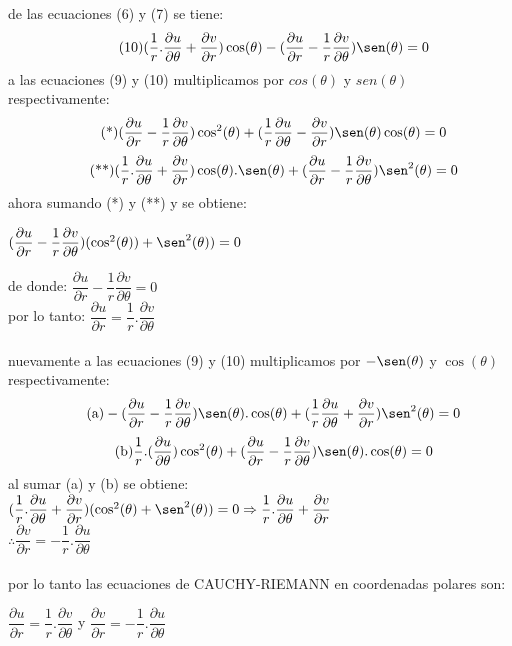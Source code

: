 \documentclass[10pt,a4paper]{book}
\begin{document}
 de las ecuaciones (6) y (7) se tiene: 
 \begin{equation}
  \tag{10}
  (\dfrac{1}{r} . \dfrac{\partial u}{\partial \theta} + \dfrac{\partial v}{\partial r}) \cos(\theta) - (\dfrac{\partial u}{\partial r} - \dfrac{1}{r} \dfrac{\partial v}{\partial \theta}) \sen(\theta) = 0 
 \end{equation}
 a las ecuaciones (9) y (10) multiplicamos por $cos(\theta)$ y $sen(\theta)$ respectivamente:
 \begin{equation}
  \tag{*}
  (\dfrac{\partial u}{\partial r} - \dfrac{1}{r} \dfrac{\partial v}{\partial \theta}) \cos^2(\theta) + (\dfrac{1}{r}\dfrac{\partial u}{\partial \theta} -  \dfrac{\partial v}{\partial r}) \sen(\theta) \cos(\theta) = 0 
 \end{equation}
 \begin{equation}
  \tag{**}
  (\dfrac{1}{r} . \dfrac{\partial u}{\partial \theta} + \dfrac{\partial v}{\partial r}) \cos(\theta). \sen(\theta) + (\dfrac{\partial u}{\partial r} - \dfrac{1}{r} \dfrac{\partial v}{\partial \theta}) \sen^2(\theta) = 0 
 \end{equation}
 ahora sumando (*) y (**) y se obtiene:
 \begin{center}
 $ (\dfrac{\partial u}{\partial r} - \dfrac{1}{r} \dfrac{\partial v}{\partial \theta})(\cos^2(\theta)) + \sen^2(\theta)) = 0 $
 \end{center}
de donde: $\dfrac{\partial u}{\partial r} - \dfrac{1}{r} \dfrac{\partial v}{\partial \theta} = 0$ \\
por lo tanto: \textbf{$\dfrac{\partial u}{\partial r} = \dfrac{1}{r}.\dfrac{\partial v}{\partial \theta}$} \\ \\
nuevamente a las ecuaciones (9) y (10) multiplicamos por $-\sen(\theta)$ y $\cos(\theta)$ respectivamente: 
\begin{equation}
 \tag{a}
 -(\dfrac{\partial u}{\partial r} - \dfrac{1}{r} \dfrac{\partial v}{\partial \theta}) \sen(\theta).\cos(\theta) +  (\dfrac{1}{r} \dfrac{\partial u}{\partial \theta} +  \dfrac{\partial v}{\partial r}) \sen^2(\theta)=0 
\end{equation}
\begin{equation}
  \tag{b}
  \dfrac{1}{r} . (\dfrac{\partial u}{\partial \theta}) \cos^2(\theta) + (\dfrac{\partial u}{\partial r} - \dfrac{1}{r} \dfrac{\partial v}{\partial \theta}) \sen(\theta) . \cos(\theta) = 0 
 \end{equation}
 al sumar (a) y (b) se obtiene:
 $(\dfrac{1}{r}.\dfrac{\partial u}{\partial \theta} + \dfrac{\partial v}{\partial r}) (\cos^2 (\theta) + \sen^2(\theta)) = 0 \Rightarrow \dfrac{1}{r}.\dfrac{\partial u}{\partial \theta} + \dfrac{\partial v}{\partial r}$ \\
 $\therefore \dfrac{\partial v}{\partial r}= - \dfrac{1}{r}.\dfrac{\partial u}{\partial \theta}$ \\ \\
 por lo tanto las ecuaciones de CAUCHY-RIEMANN en coordenadas polares son:
\begin{center}
 \textbf{$\dfrac{\partial u}{\partial r} = \dfrac{1}{r}.\dfrac{\partial v}{\partial \theta}$} y \textbf{$\dfrac{\partial v}{\partial r} = -\dfrac{1}{r}.\dfrac{\partial u}{\partial \theta}$}
\end{center}
\end{document}
